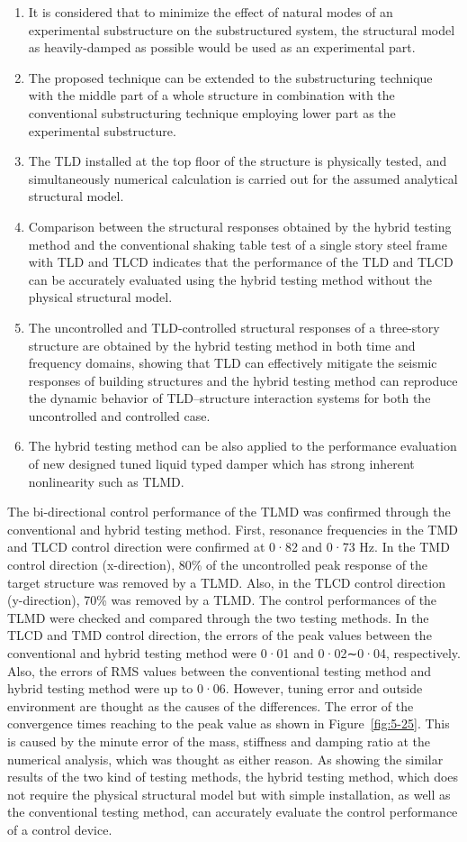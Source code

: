 \begin{enumerate}
\item It is considered that to minimize the effect of natural modes of an experimental substructure on the substructured system, the structural model as heavily-damped as possible would be used as an experimental part.
\item The proposed technique can be extended to the substructuring technique with the middle part of a whole structure in combination with the conventional substructuring technique employing lower part as the experimental substructure.
\item The TLD installed at the top floor of the structure is physically tested, and simultaneously numerical calculation is carried out for the assumed analytical structural model.
\item Comparison between the structural responses obtained by the hybrid testing method and the conventional shaking table test of a single story steel frame with TLD and TLCD indicates that the performance of the TLD and TLCD can be accurately evaluated using the hybrid testing method without the physical structural model.
\item The uncontrolled and TLD-controlled structural responses of a three-story structure are obtained by the hybrid testing method in both time and frequency domains, showing that TLD can effectively mitigate the seismic responses of building structures and the hybrid testing method can reproduce the dynamic behavior of TLD–structure interaction systems for both the uncontrolled and controlled case.
\item The hybrid testing method can be also applied to the performance evaluation of new designed tuned liquid typed damper which has strong inherent nonlinearity such as TLMD.
\end{enumerate}


The bi-directional control performance of the TLMD was confirmed through the conventional and hybrid testing method. First, resonance frequencies in the TMD and TLCD control direction were confirmed at 0·82 and 0·73 Hz. In the TMD control direction (x-direction), 80\% of the uncontrolled peak response of the target structure was removed by a TLMD. Also, in the TLCD control direction (y-direction), 70\% was removed by a TLMD. 
The control performances of the TLMD were checked and compared through the two testing methods. In the TLCD and TMD control direction, the errors of the peak values between the conventional and hybrid testing method were 0·01 and 0·02∼0·04, respectively. Also, the errors of RMS values between the conventional testing method and hybrid testing method were up to 0·06. However, tuning error and outside environment are thought as the causes of the differences. The error of the convergence times reaching to the peak value as shown in Figure~\ref{fig:5-25}. This is caused by the minute error of the mass, stiffness and damping ratio at the numerical analysis, which was thought as either reason. 
As showing the similar results of the two kind of testing methods, the hybrid testing method, which does not require the physical structural model but with simple installation, as well as the conventional testing method, can accurately evaluate the control performance of a control device.